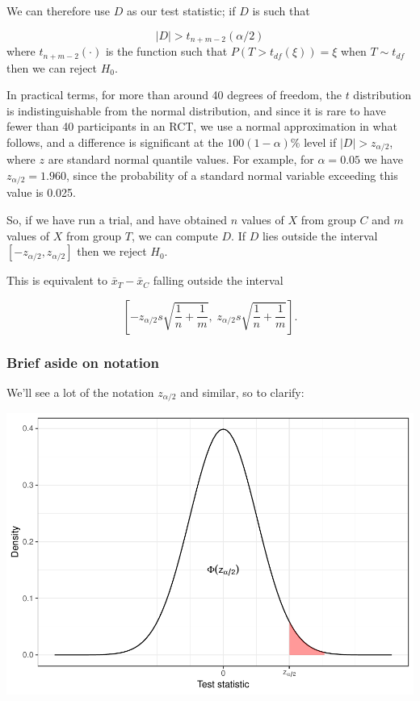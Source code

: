 \documentclass[
  openany]{book}
\theoremstyle{definition}
\theoremstyle{definition}
\theoremstyle{definition}
\theoremstyle{definition}
\theoremstyle{remark}
\begin{document}
We can therefore use \(D\) as our test statistic; if \(D\) is such that

\[ |D| > t_{n+m-2}\left(\alpha/2\right)\]
where
\(t_{n+m-2}\left(\cdot\right)\) is the function such that \(P\left(T>t_{df}\left(\xi\right)\right) = \xi\) when \(T \sim{t_{df}}\) then we can reject \(H_0\).

In practical terms, for more than around 40 degrees of freedom, the \(t\) distribution is indistinguishable from the normal distribution, and since it is rare to have fewer than 40 participants in an RCT, we use a normal approximation in what follows, and a difference is significant at the \(100\left(1-\alpha\right) \%\) level if \(|D| > z_{\alpha/2}\), where \(z\) are standard normal quantile values. For example, for \(\alpha=0.05\) we have \(z_{\alpha/2} = 1.960\), since the probability of a standard normal variable exceeding this value is 0.025.

So, if we have run a trial, and have obtained \(n\) values of \(X\) from group \(C\) and \(m\) values of \(X\) from group \(T\), we can compute \(D\). If \(D\) lies outside the interval \(\left[-z_{\alpha/2}, z_{\alpha/2}\right]\) then we reject \(H_0\).

This is equivalent to \(\bar{x}_T - \bar{x}_C\) falling outside the interval

\[\left[-z_{\alpha/2}s\sqrt{\frac{1}{n} + \frac{1}{m}},\; z_{\alpha/2}s\sqrt{\frac{1}{n} + \frac{1}{m}}  \right]. \]

\subsubsection*{Brief aside on notation}\label{brief-aside-on-notation}

We'll see a lot of the notation \(z_{\alpha/2}\) and similar, so to clarify:

\includegraphics{CT4H_notes_files/figure-latex/unnamed-chunk-4-1.pdf}
\end{document}
